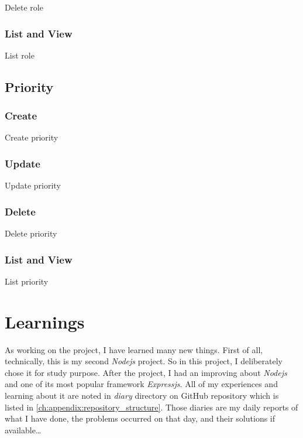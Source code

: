 Delete role

\subsubsection{List and View}
\label{ch:result:user_guide:role:list}

List role

\subsection{Priority}
\label{ch:result:user_guide:priority}
\subsubsection{Create}
\label{ch:result:user_guide:priority:create}

Create priority

\subsubsection{Update}
\label{ch:result:user_guide:priority:update}

Update priority

\subsubsection{Delete}
\label{ch:result:user_guide:priority:delete}

Delete priority

\subsubsection{List and View}
\label{ch:result:user_guide:priority:list}

List priority

\section{Learnings}

As working on the project, I have learned many new things.
First of all, technically, this is my second \emph{Nodejs} project.
So in this project, I deliberately chose it for study purpose.
After the project, I had an improving about \emph{Nodejs} and one of its most popular framework \emph{Expressjs}.
All of my experiences and learning about it are noted in \emph{diary} directory on GitHub repository which is listed in \autoref{ch:appendix:repository_structure}.
Those diaries are my daily reports of what I have done, the problems occurred on that day, and their solutions if available\dots

